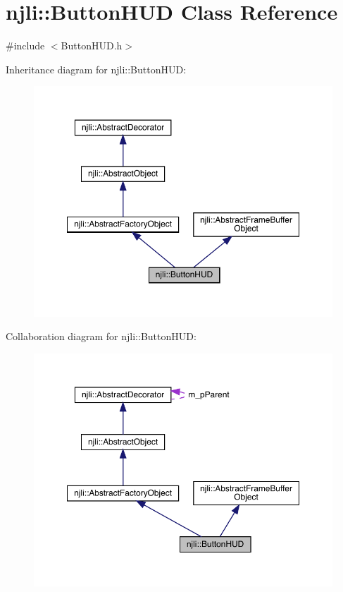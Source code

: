 \hypertarget{classnjli_1_1_button_h_u_d}{}\section{njli\+:\+:Button\+H\+UD Class Reference}
\label{classnjli_1_1_button_h_u_d}


{\ttfamily \#include $<$Button\+H\+U\+D.\+h$>$}



Inheritance diagram for njli\+:\+:Button\+H\+UD\+:\nopagebreak
\begin{figure}[H]
\begin{center}
\leavevmode
\includegraphics[width=350pt]{classnjli_1_1_button_h_u_d__inherit__graph}
\end{center}
\end{figure}


Collaboration diagram for njli\+:\+:Button\+H\+UD\+:\nopagebreak
\begin{figure}[H]
\begin{center}
\leavevmode
\includegraphics[width=350pt]{classnjli_1_1_button_h_u_d__coll__graph}
\end{center}
\end{figure}
